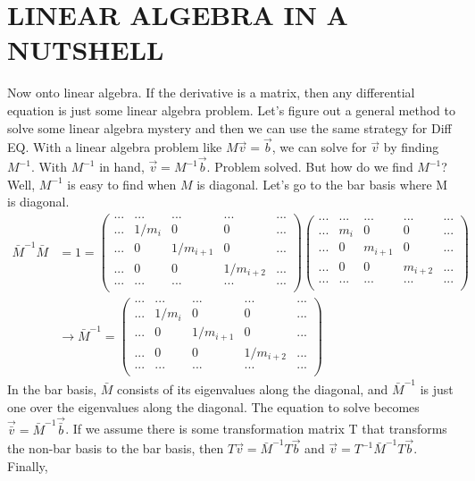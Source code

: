 \documentclass[12pt]{article}
\begin{document}
\section{LINEAR ALGEBRA IN A NUTSHELL}
Now onto linear algebra. If the derivative is a matrix, then any differential equation is just some linear algebra problem. Let's figure out a general method to solve some linear algebra mystery and then we can use the same strategy for Diff EQ. With a linear algebra problem like $M\vec{v} = \vec{b}$, we can solve for $\vec{v}$ by finding $M^{-1}$. With $M^{-1}$ in hand, $\vec{v} = M^{-1}\vec{b}$. Problem solved. But how do we find $M^{-1}$? Well, $M^{-1}$ is easy to find when $M$ is diagonal. Let's go to the bar basis where M is diagonal.
\begin{equation}
\label{minv}
\begin{split}
\bar{M}^{-1}\bar{M} &= 1 = 
\begin{pmatrix}
... & ... & ... & ... & ... \\
... & 1/m_i & 0 & 0 & ... \\
... & 0 & 1/m_{i+1} & 0 & ... \\
... & 0 & 0 & 1/m_{i+2} & ... \\
... & ... & ... & ... & ... \\
\end{pmatrix}
\begin{pmatrix}
... & ... & ... & ... & ... \\
... & m_i & 0 & 0 & ... \\
... & 0 & m_{i+1} & 0 & ... \\
... & 0 & 0 & m_{i+2} & ... \\
... & ... & ... & ... & ... \\
\end{pmatrix} \\
&\rightarrow \bar{M}^{-1} =  
\begin{pmatrix}
... & ... & ... & ... & ... \\
... & 1/m_i & 0 & 0 & ... \\
... & 0 & 1/m_{i+1} & 0 & ... \\
... & 0 & 0 & 1/m_{i+2} & ... \\
... & ... & ... & ... & ... \\
\end{pmatrix}
\end{split}
\end{equation}
In the bar basis, $\bar{M}$ consists of its eigenvalues along the diagonal, and $\bar{M}^{-1}$ is just one over the eigenvalues along the diagonal. The equation to solve becomes $\vec{\bar{v}} = \bar{M}^{-1}\vec{\bar{b}}$. If we assume there is some transformation matrix T that transforms the non-bar basis to the bar basis, then $T\vec{v} = \bar{M}^{-1}T\vec{b}$ and $\vec{v} = T^{-1}\bar{M}^{-1}T\vec{b}$. Finally, 
\end{document}
